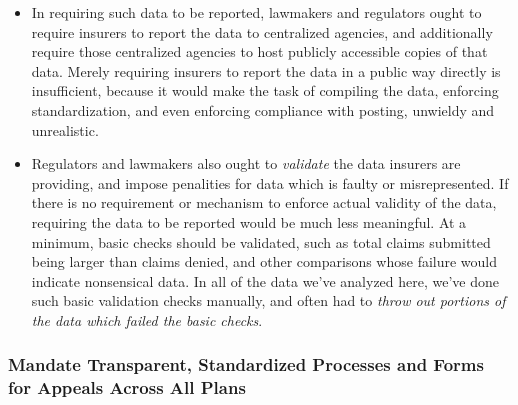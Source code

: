 \documentclass[12pt, a4paper,twoside]{report}
\theoremstyle{plain} %
\theoremstyle{definition} %
\theoremstyle{remark} %
\numberwithin{equation}{chapter}
\begin{document}
\begin{itemize}
			\item In requiring such data to be reported, lawmakers and regulators ought to require insurers to report the data to centralized agencies, and additionally require those centralized agencies to host publicly accessible copies of that data. Merely requiring insurers to report the data in a public way directly is insufficient, because it would make the task of compiling the data, enforcing standardization, and even enforcing compliance with posting, unwieldy and unrealistic.
			
			\item Regulators and lawmakers also ought to \emph{validate} the data insurers are providing, and impose penalities for data which is faulty or misrepresented. If there is no requirement or mechanism to enforce actual validity of the data, requiring the data to be reported would be much less meaningful. At a minimum, basic checks should be validated, such as total claims submitted being larger than claims denied, and other comparisons whose failure would indicate nonsensical data. In all of the data we've analyzed here, we've done such basic validation checks manually, and often had to \emph{throw out portions of the data which failed the basic checks}.
		\end{itemize}
		
		\subsubsection{Mandate Transparent, Standardized Processes and Forms for Appeals Across All Plans}
		
\end{document}

